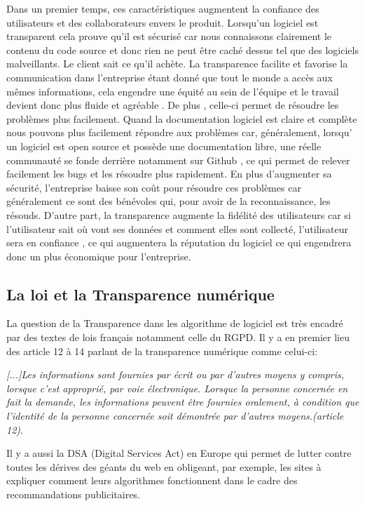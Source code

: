\documentclass{article}
\begin{document}
Dans un premier temps, ces caractéristiques augmentent la confiance des utilisateurs et des collaborateurs envers le produit. Lorsqu'un logiciel est transparent cela prouve qu’il est sécurisé \cite{sécurite_transparence}
car nous connaissons clairement le contenu du code source et donc rien ne peut être caché dessus tel que des logiciels malveillants. Le client  sait ce qu’il achète.  La transparence facilite et favorise la communication dans l'entreprise étant donné que tout le monde a accès aux mêmes informations, cela engendre une équité au sein de l’équipe  et le travail devient donc plus fluide et agréable . 
De plus , celle-ci permet de résoudre les problèmes plus facilement. Quand la documentation logiciel est claire et complète nous pouvons plus facilement répondre aux problèmes car, généralement, lorsqu' un logiciel est open source et possède une documentation libre, une réelle communauté se fonde derrière notamment sur Github , ce qui permet de relever facilement les bugs et les résoudre plus rapidement. En plus d’augmenter sa sécurité, l'entreprise baisse son coût pour résoudre  ces problèmes car généralement ce sont des bénévoles qui, pour avoir de la reconnaissance, les résouds.
D'autre part, la transparence  augmente la fidélité des utilisateurs car si l'utilisateur sait où vont ses données et comment elles sont collecté, l’utilisateur sera en confiance , ce qui augmentera la réputation du logiciel ce qui engendrera donc un plus économique pour l'entreprise. 
\subsection{La loi et la Transparence numérique}
La question de la Transparence dans les algorithme de logiciel est très encadré par des textes de lois français notamment celle du RGPD. Il y a en premier lieu des article 12 à 14 parlant de la transparence numérique comme celui-ci:
 
 \textit{[...]Les informations sont fournies par écrit ou par d'autres moyens y compris, lorsque c'est approprié, par voie électronique. Lorsque la personne concernée en fait la demande, les informations peuvent être fournies oralement, à condition que l'identité de la personne concernée soit démontrée par d'autres moyens.(article 12)}. \cite{loi_transparence}

Il y a aussi  la DSA (Digital Services Act) en Europe  qui permet de lutter contre toutes les dérives des géants du web en obligeant, par exemple, les sites à expliquer comment leurs algorithmes fonctionnent dans le cadre des recommandations publicitaires.
\cite{digital_act}
\end{document}
